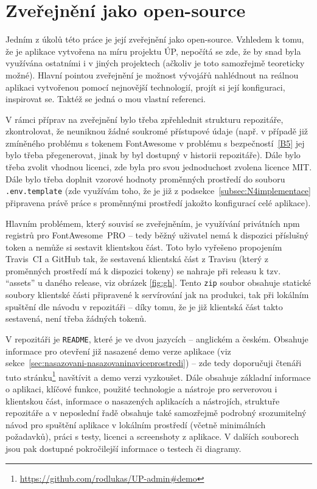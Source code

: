 \chapter{Zveřejnění jako open-source}\label{chap:zverejnenijakoopensource}

Jedním z úkolů této práce je její zveřejnění jako open-source. Vzhledem k tomu, že je aplikace vytvořena na míru projektu ÚP, nepočítá se zde, že by snad byla využívána ostatními i v jiných projektech (ačkoliv je toto samozřejmě teoreticky možné). Hlavní pointou zveřejnění je možnost vývojářů nahlédnout na reálnou aplikaci vytvořenou pomocí nejnovější technologií, projít si její konfiguraci, inspirovat se. Taktéž se jedná o mou vlastní referenci.

V rámci příprav na zveřejnění bylo třeba zpřehlednit strukturu repozitáře, zkontrolovat, že neuniknou žádné soukromé přístupové údaje (např. v případě již zmíněného problému s tokenem FontAwesome v problému s bezpečností~\ref{B5} jej bylo třeba přegenerovat, jinak by byl dostupný v historii repozitáře). Dále bylo třeba zvolit vhodnou licenci, zde byla pro svou jednoduchost zvolena licence MIT. Dále bylo třeba doplnit vzorové hodnoty proměnných prostředí do souboru \verb|.env.template| (zde využívám toho, že je již z podsekce~\ref{subsec:N4implementace} připravena právě práce s proměnnými prostředí jakožto konfigurací celé aplikace).

Hlavním problémem, který souvisí se zveřejněním, je využívání privátních npm registrů pro FontAwesome~PRO -- tedy běžný uživatel nemá k dispozici příslušný token a nemůže si sestavit klientskou část. Toto bylo vyřešeno propojením Travis~CI a GitHub tak, že sestavená klientská část z Travisu (který z proměnných prostředí má k dispozici tokeny) se nahraje při releasu k tzv. \enquote{assets} u daného release, viz obrázek \ref{fig:gh}. Tento \verb|zip| soubor obsahuje statické soubory klientské části připravené k servírování jak na produkci, tak při lokálním spuštění dle návodu v repozitáři -- díky tomu, že je již klientská část takto sestavená, není třeba žádných tokenů.

V repozitáři je \verb|README|, které je ve dvou jazycích -- anglickém a českém. Obsahuje informace pro otevření již nasazené demo verze aplikace (viz sekce~\ref{sec:nasazovani-nasazovaninaviceprostredi}) -- zde tedy doporučuji čtenáři tuto stránku\footnote{\url{https://github.com/rodlukas/UP-admin\#demo}} navštívit a demo verzi vyzkoušet. Dále obsahuje základní informace o aplikaci, klíčové funkce, použité technologie a nástroje pro serverovou i klientskou část, informace o nasazených aplikacích a nástrojích, struktuře repozitáře a v neposlední řadě obsahuje také samozřejmě podrobný srozumitelný návod pro spuštění aplikace v lokálním prostředí (včetně minimálních požadavků), práci s testy, licenci a screenshoty z aplikace. V dalších souborech jsou pak dostupné pokročilejší informace o testech či diagramy.

